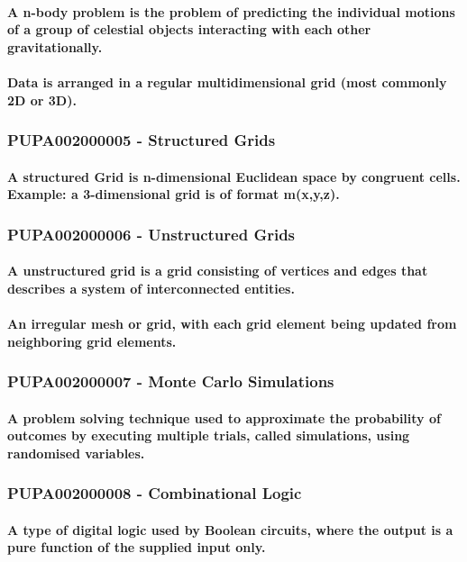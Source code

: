 \documentclass{acm_proc_article-sp}
\begin{document}
\paragraph{A n-body problem is the problem of predicting the individual motions of a group of celestial objects interacting with each other gravitationally.}
\paragraph{Data is arranged in a regular multidimensional grid (most commonly 2D or 3D).}
\subsubsection{PUPA002000005 - Structured Grids}
\paragraph{A structured Grid is n-dimensional Euclidean space by congruent cells. Example: a 3-dimensional grid is of format m(x,y,z).}
\subsubsection{PUPA002000006 - Unstructured Grids}
\paragraph{A unstructured grid is a grid consisting of vertices and edges that describes a system of interconnected entities.}
\paragraph{An irregular mesh or grid, with each grid element being updated from neighboring grid elements.}
\subsubsection{PUPA002000007 - Monte Carlo Simulations}
\paragraph{A problem solving technique used to approximate the probability of outcomes by executing multiple trials, called simulations, using randomised variables.}
\subsubsection{PUPA002000008 - Combinational Logic}
\paragraph{A type of digital logic used by Boolean circuits, where the output is a pure function of the supplied input only.}
\end{document}
